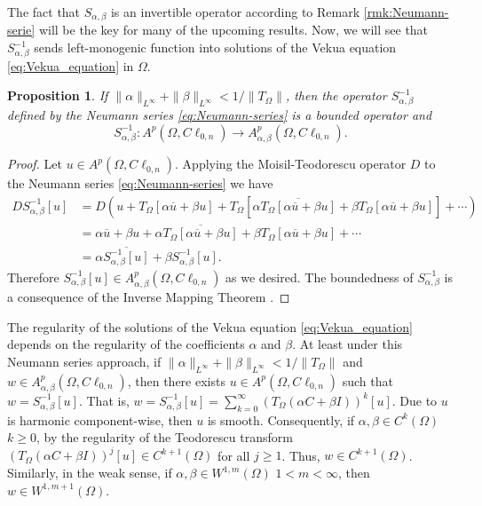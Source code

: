 \documentclass[12pt]{article}
\newtheorem{proposition}[theorem]{Proposition}
\def\D{\mathbb{D}}
\newcommand{\JLm}[1]{\textcolor{magenta}{#1}}
\begin{document}
The fact that $S_{\alpha,\beta}$ is an invertible operator according to Remark \ref{rmk:Neumann-serie} will be the key for many of the upcoming results. Now, we will see that $S_{\alpha,\beta}^{-1}$ sends left-monogenic function into solutions of the Vekua equation \eqref{eq:Vekua_equation} in $\Omega$.
\begin{proposition}\label{prop:inverse}
If $\|\alpha\|_{L^{\infty}}+\|\beta \|_{L^{\infty}}< 1/\|T_{\Omega}\|$, then the operator $S_{\alpha,\beta}^{-1}$ defined by the Neumann series \eqref{eq:Neumann-series} is a bounded operator and 
\[
S_{\alpha,\beta}^{-1}\colon A^p(\Omega,C\ell_{0,n}) \to A_{\alpha,\beta}^p(\Omega,C\ell_{0,n}).
\]
\end{proposition}
\begin{proof}
Let $u\in A^p(\Omega,C\ell_{0,n})$. Applying the Moisil-Teodorescu operator $D$ to the Neumann series \eqref{eq:Neumann-series} we have
\begin{align*}
D S_{\alpha,\beta}^{-1}[u]&=D\left(u+T_{\Omega}[\alpha \overline{u}+\beta u]+T_{\Omega}[\alpha \overline{T_{\Omega}[\alpha \overline{u}+\beta u]}+\beta T_{\Omega}[\alpha \overline{u}+\beta u]]+\cdots \right)\\
&=\alpha \overline{u}+\beta u + \alpha \overline{T_{\Omega}[\alpha \overline{u}+\beta u]} +\beta T_{\Omega}[\alpha \overline{u}+\beta u]+\cdots\\
&=\alpha \overline{S_{\alpha,\beta}^{-1}[u]}+\beta S_{\alpha,\beta}^{-1}[u].
\end{align*}
Therefore $S_{\alpha,\beta}^{-1}[u]\in A_{\alpha,\beta}^p(\Omega,C\ell_{0,n})$ as we desired. The boundedness of $S_{\alpha,\beta}^{-1}$ is a consequence of the Inverse Mapping Theorem \cite[Th.\ 1.1]{Kub2012}.
\end{proof}
The regularity of the solutions of the Vekua equation \eqref{eq:Vekua_equation} depends on the regularity of the coefficients $\alpha$ and $\beta$. At least under this Neumann series approach, if $\|\alpha\|_{L^{\infty}}+\|\beta \|_{L^{\infty}}< 1/\|T_{\Omega}\|$ and $w\in A_{\alpha,\beta}^p(\Omega,C\ell_{0,n})$, then there exists $u\in A^p(\Omega,C\ell_{0,n})$ such that $w=S_{\alpha,\beta}^{-1}[u]$. That is, $w=S_{\alpha,\beta}^{-1}[u]=\sum_{k=0}^{\infty} (T_{\Omega}(\alpha C+\beta I))^k[u]$. Due to $u$ is harmonic component-wise, then $u$ is smooth. Consequently, if $\alpha, \beta\in C^k(\Omega)$ $k\geq 0$, by the regularity of the Teodorescu transform $(T_{\Omega}(\alpha C+\beta I))^j[u]\in C^{k+1}(\Omega)$ for all $j\geq 1$. Thus, $w\in C^{k+1}(\Omega)$. Similarly, in the weak sense, if $\alpha, \beta\in W^{1,m}(\Omega)$ $1<m<\infty$, then $w\in W^{1, m+1}(\Omega)$.
\color{black}
\end{document}
